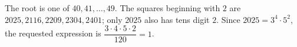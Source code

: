 The root is one of $40,41,\ldots,49$. The squares beginning with $2$ are $2025,2116,2209,2304,2401$; only $2025$ also has tens digit $2$. Since $2025=3^4\cdot5^2$, the requested expression is $\dfrac{3\cdot4\cdot5\cdot2}{120}=\boxed1$.
